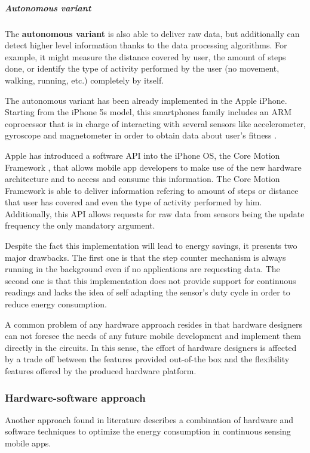 \subparagraph{Autonomous variant}
\label{subp:autonomous_variant}

The \textbf{autonomous variant} is also able to deliver raw data, but additionally can detect higher level information thanks to the data processing algorithms.
For example, it might measure the distance covered by user, the amount of steps done, or identify the type of activity performed by the user (no movement, walking, running, etc.) completely by itself.


The autonomous variant has been already implemented in the Apple iPhone.
Starting from the iPhone 5s model, this smartphones family includes an ARM coprocessor that is in charge of interacting with several sensors like accelerometer, gyroscope and magnetometer in order to obtain data about user's fitness \cite{Sathiah2013}.

Apple has introduced a software API into the iPhone OS, the Core Motion Framework \cite{Apple2013}, that allows mobile app developers to make use of the new hardware architecture and to access and consume this information.
The Core Motion Framework is able to deliver information refering to amount of steps or distance that user has covered and even the type of activity performed by him.
Additionally, this API allows requests for raw data from sensors being the update frequency the only mandatory argument.

Despite the fact this implementation will lead to energy savings, it presents two major drawbacks.
The first one is that the step counter mechanism is always running in the background even if no applications are requesting data.
The second one is that this implementation does not provide support for continuous readings and lacks the idea of self adapting the sensor's duty cycle in order to reduce energy consumption.

A common problem of any hardware approach resides in that hardware designers can not foresee the needs of any future mobile development and implement them directly in the circuits.
In this sense, the effort of hardware designers is affected by a trade off between the features provided out-of-the box and the flexibility features offered by the produced hardware platform.

\subsubsection{Hardware-software approach}

Another approach found in literature describes a combination of hardware and software techniques to optimize the energy consumption in continuous sensing mobile apps.

